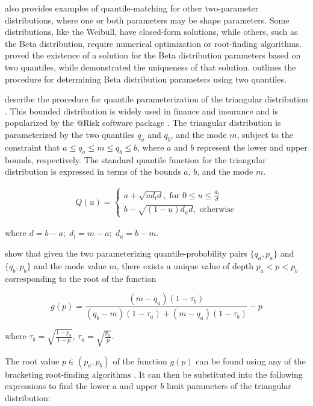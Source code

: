 \documentclass[
  fleqn,
  deca,
  blindrev
]{informs4}
\begin{document}
\textcolor[HTML]{ff0000}{\citet{cook2010DeterminingDistributionParameters}
also provides examples of quantile-matching for other two-parameter
distributions, where one or both parameters may be shape parameters.
Some distributions, like the Weibull, have closed-form solutions, while
others, such as the Beta distribution, require numerical optimization or
root-finding algorithms. \citet{vandorp2000SolvingParametersBeta} proved
the existence of a solution for the Beta distribution parameters based
on two quantiles, while \citet{shih2015ModelIdentificationBetaa}
demonstrated the uniqueness of that solution.
\citet{vandorp2000SolvingParametersBeta} outlines the procedure for
determining Beta distribution parameters using two quantiles.}

\citet{kotz2004BetaOtherContinuous} describe the
\textcolor[HTML]{ff0000}{procedure for quantile parameterization} of the
triangular distribution \citep{johnson1997TriangularDistributionProxy}.
This bounded distribution is widely used in finance and insurance and is
popularized by the @Risk software package
\citep{palisadecorporation2009GuideUsingRISK}. The triangular
distribution is parameterized by the two quantiles \(q_{a}\) and
\(q_{b}\), and the mode \(m\), subject to the constraint that
\(a\leq q_a\leq m\leq q_b\leq b\), where \(a\) and \(b\) represent the
lower and upper bounds, respectively. The standard quantile function for
the triangular distribution is expressed in terms of the bounds \(a\),
\(b\), and the mode \(m\).

\[
\begin{gathered}
Q(u)=\begin{cases}
a+\sqrt{ud_ld}, \; \text{for } 0\leq u \leq\frac{d_l}{d}\\
b-\sqrt{(1-u)d_ud}, \; \text{otherwise}
\end{cases}
\end{gathered}
\]

where \(d=b-a;\; d_l=m-a;\; d_u=b-m\).

\citet{kotz2004BetaOtherContinuous} show that given the two
parameterizing quantile-probability pairs \(\{q_a,p_a\}\) and
\(\{q_b,p_b\}\) and the mode value \(m\), there exists a unique value of
depth \(p_a<p<p_b\) corresponding to the root of the function

\[
g(p)=\frac{(m-q_a)(1-\tau_b)}{(q_b-m)(1-\tau_a)+(m-q_a)(1-\tau_b)}-p
\]

where \(\tau_b=\sqrt{\frac{1-p_b}{1-p}}\),
\(\tau_a=\sqrt{\frac{p_a}{p}}\).

The root value \(p\in (p_a,p_b)\) of the function \(g(p)\) can be found
using any of the bracketing root-finding algorithms
\citep{perepolkin2023TenetsQuantilebasedInference}. It can then be
substituted into the following expressions to find the lower \(a\) and
upper \(b\) limit parameters of the triangular distribution:
\end{document}
